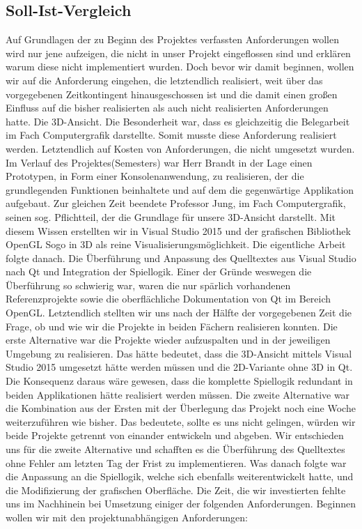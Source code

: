 \documentclass[a4paper]{scrartcl}
\begin{document}
\subsection{Soll-Ist-Vergleich}\label{ch:Vergleich}
Auf Grundlagen der zu Beginn des Projektes verfassten Anforderungen wollen wird nur jene aufzeigen, die nicht in unser Projekt eingeflossen sind und erklären warum diese nicht implementiert wurden. Doch bevor wir damit beginnen, wollen wir auf die Anforderung eingehen, die letztendlich realisiert, weit über das vorgegebenen Zeitkontingent hinausgeschossen ist und die damit einen großen Einfluss auf die bisher realisierten als auch nicht realisierten Anforderungen hatte. Die 3D-Ansicht. Die Besonderheit war, dass es gleichzeitig die Belegarbeit im Fach Computergrafik darstellte. Somit musste diese Anforderung realisiert werden. Letztendlich auf Kosten von Anforderungen, die nicht umgesetzt wurden. Im Verlauf des Projektes(Semesters) war Herr Brandt in der Lage einen Prototypen, in Form einer Konsolenanwendung, zu realisieren, der die grundlegenden Funktionen beinhaltete und auf dem die gegenwärtige Applikation aufgebaut. Zur gleichen Zeit beendete Professor Jung, im Fach Computergrafik, seinen sog. Pflichtteil, der die Grundlage für unsere 3D-Ansicht darstellt. Mit diesem Wissen erstellten wir in Visual Studio 2015 und der grafischen Bibliothek OpenGL Sogo in 3D als reine Visualisierungsmöglichkeit. Die eigentliche Arbeit folgte danach. Die Überführung und Anpassung des Quelltextes aus Visual Studio nach Qt und Integration der Spiellogik. Einer der Gründe weswegen die Überführung so schwierig war, waren die nur spärlich vorhandenen Referenzprojekte sowie die oberflächliche Dokumentation von Qt im Bereich OpenGL. Letztendlich stellten wir uns nach der Hälfte der vorgegebenen Zeit die Frage, ob und wie wir die Projekte in beiden Fächern realisieren konnten. Die erste Alternative war die Projekte wieder aufzuspalten und in der jeweiligen Umgebung zu realisieren. Das hätte bedeutet, dass die 3D-Ansicht mittels Visual Studio 2015 umgesetzt hätte werden müssen und die 2D-Variante ohne 3D in Qt. Die Konsequenz daraus wäre gewesen, dass die komplette Spiellogik redundant in beiden Applikationen hätte realisiert werden müssen. 
Die zweite Alternative war die Kombination aus der Ersten mit der Überlegung das Projekt noch eine Woche weiterzuführen wie bisher. Das bedeutete, sollte es uns nicht gelingen, würden wir beide Projekte getrennt von einander entwickeln und abgeben. Wir entschieden uns für die zweite Alternative und schafften es die Überführung des Quelltextes ohne Fehler am letzten Tag der Frist zu implementieren. Was danach folgte war die Anpassung an die Spiellogik, welche sich ebenfalls weiterentwickelt hatte, und die Modifizierung der grafischen Oberfläche. Die Zeit, die wir investierten fehlte uns im Nachhinein bei Umsetzung einiger der folgenden Anforderungen. Beginnen wollen wir mit den projektunabhängigen Anforderungen:
\end{document}
